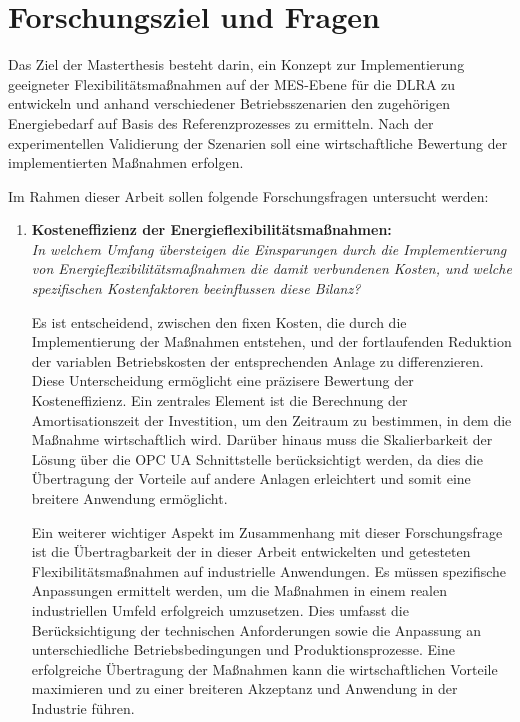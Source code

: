 \section{Forschungsziel und Fragen}
\label{ch_04Forschungsziel und Fragen}

Das Ziel der Masterthesis besteht darin, ein Konzept zur Implementierung geeigneter Flexibilitätsmaßnahmen auf der MES-Ebene für die DLRA zu entwickeln und anhand verschiedener Betriebsszenarien den zugehörigen Energiebedarf auf Basis des Referenzprozesses zu ermitteln. Nach der experimentellen Validierung der Szenarien soll eine wirtschaftliche Bewertung der implementierten Maßnahmen erfolgen.

Im Rahmen dieser Arbeit sollen folgende Forschungsfragen untersucht werden:

\begin{enumerate}[label=\textbf{\arabic*.}]
	\item \textbf{Kosteneffizienz der Energieflexibilitätsmaßnahmen:}\\ \emph{In welchem Umfang übersteigen die Einsparungen durch die Implementierung von Energieflexibilitätsmaßnahmen die damit verbundenen Kosten, und welche spezifischen Kostenfaktoren beeinflussen diese Bilanz?}
	
	Es ist entscheidend, zwischen den fixen Kosten, die durch die Implementierung der Maßnahmen entstehen, und der fortlaufenden Reduktion der variablen Betriebskosten der entsprechenden Anlage zu differenzieren. Diese Unterscheidung ermöglicht eine präzisere Bewertung der Kosteneffizienz. Ein zentrales Element ist die Berechnung der Amortisationszeit der Investition, um den Zeitraum zu bestimmen, in dem die Maßnahme wirtschaftlich wird. Darüber hinaus muss die Skalierbarkeit der Lösung über die OPC UA Schnittstelle berücksichtigt werden, da dies die Übertragung der Vorteile auf andere Anlagen erleichtert und somit eine breitere Anwendung ermöglicht.
	
	Ein weiterer wichtiger Aspekt im Zusammenhang mit dieser Forschungsfrage ist die Übertragbarkeit der in dieser Arbeit entwickelten und getesteten Flexibilitätsmaßnahmen auf industrielle Anwendungen. Es müssen spezifische Anpassungen ermittelt werden, um die Maßnahmen in einem realen industriellen Umfeld erfolgreich umzusetzen. Dies umfasst die Berücksichtigung der technischen Anforderungen sowie die Anpassung an unterschiedliche Betriebsbedingungen und Produktionsprozesse. Eine erfolgreiche Übertragung der Maßnahmen kann die wirtschaftlichen Vorteile maximieren und zu einer breiteren Akzeptanz und Anwendung in der Industrie führen.
	

\end{enumerate}
